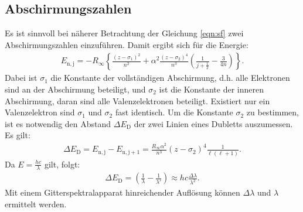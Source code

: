 \subsection{Abschirmungszahlen}
Es ist sinnvoll bei näherer Betrachtung der Gleichung \eqref{eqn:sf} zwei Abschirmungszahlen einzuführen.
Damit ergibt sich für die Energie:
\begin{align}
  E_\mathrm{n,j}=-R_\mathrm{\infty}\left\{\frac{(z-\sigma_\mathrm{1})^2}{n^2}+\alpha^2\frac{(z-\sigma_\mathrm{2})^4}{n^3}\left(\frac{1}{j+\frac{1}{2}}-\frac{3}{4n}\right)\right\}.
\end{align}
Dabei ist $\sigma_\mathrm{1}$ die Konstante der vollständigen Abschirmung, d.h. alle Elektronen sind an der Abschirmung beteiligt,
und $\sigma_\mathrm{2}$ ist die Konstante der inneren Abschirmung, daran sind alle Valenzelektronen beteiligt.
Existiert nur ein Valenzelektron sind $\sigma_\mathrm{1}$ und $\sigma_\mathrm{2}$ fast identisch.
Um die Konstante $\sigma_\mathrm{2}$ zu bestimmen, ist es notwendig den Abstand $\Delta E_\mathrm{D}$ der zwei Linien eines Dubletts auszumessen.
Es gilt:
\begin{align}
  \Delta E_\mathrm{D} = E_\mathrm{n,j}-E_\mathrm{n,j+1}=\frac{R_\mathrm{\infty}\alpha^2}{n^3}(z-\sigma_\mathrm{2})^4\frac{1}{\ell(\ell+1)}. \label{eqn:popo}
\end{align}
Da $E=\frac{hc}{\lambda}$ gilt, folgt:
\begin{align}
\Delta E_\mathrm{D}=\left(\frac{1}{\lambda}-\frac{1}{\lambda'}\right) \approx hc\frac{\Delta\lambda}{\lambda^2}.\label{eqn:E}
\end{align}
Mit einem Gitterspektralapparat hinreichender Auflösung können $\Delta\lambda$ und $\lambda$ ermittelt werden.
